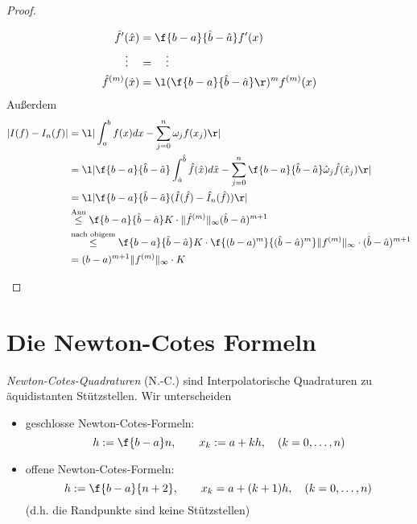 \documentclass[11pt]{scrbook}
\begin{document}
\begin{st}[Koordinatentransformation]
\begin{proof}
\begin{enumerate}[i)]
\begin{align*}
					\hat f'(\hat x) &= \f {b-a}{\hat b - \hat a}f'(x) \\
					\vdots \quad &= \quad \vdots \\
					\hat f^{(m)}(\hat x) &= \l( \f {b-a}{\hat b-\hat a} \r)^m f^{(m)}(x)
				\end{align*}
				Außerdem
				\begin{align*}
					|I(f) - I_n(f)| 
					&= \l| \int_a^b f(x) dx - \sum_{j=0}^n \omega_j f(x_j) \r| \\
					&= \l| \f {b-a}{\hat b- \hat a} \int_{\hat a}^{\hat b} \hat f(\hat x) d\hat x - \sum_{j=0}^n \f {b-a}{\hat b - \hat a} \hat \omega_j \hat f(\hat x_j) \r| \\
					&= \l| \f {b-a}{\hat b - \hat a} (\hat I(\hat f) - \hat I_n(\hat f)) \r| \\
					&\stackrel{\text{Ann}}\le \f {b-a}{\hat b - \hat a}K\cdot \|\hat f^{(m)}\|_\infty (\hat b - \hat a)^{m+1} \\
					&\stackrel{\text{nach obigem}}\le \f {b-a}{\hat b - \hat a} K \cdot \f {(b-a)^m}{(\hat b - \hat a)^m} \|f^{(m)}\|_\infty \cdot (\hat b - \hat a)^{m+1} \\
					&= (b-a)^{m+1}\|f^{(m)}\|_\infty \cdot K
				\end{align*}
		\end{enumerate}
	\end{proof}
\end{st}


\section{Die Newton-Cotes Formeln}


\begin{df}
	\label{2.9}
	\emph{Newton-Cotes-Quadraturen} (N.-C.) sind Interpolatorische Quadraturen zu äquidistanten Stützstellen.
	Wir unterscheiden
	\begin{itemize}
		\item
			geschlosse Newton-Cotes-Formeln:
			\[
				h:= \f {b-a}n, \qquad x_k := a + kh, \quad (k=0,\dotsc,n)
			\]
		\item
			offene Newton-Cotes-Formeln:
			\[
				h:= \f {b-a}{n+2}, \qquad x_k = a+ (k+1)h, \quad (k=0,\dotsc,n)
			\]
			(d.h. die Randpunkte sind keine Stützstellen)
	\end{itemize}
\end{df}
\end{document}
